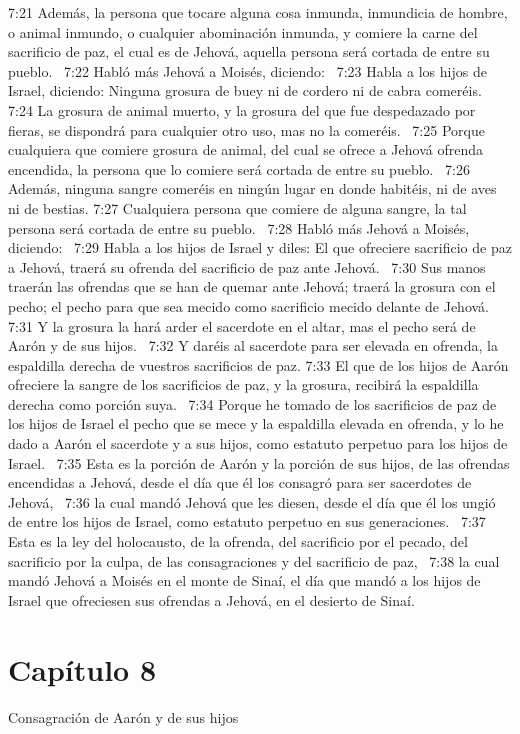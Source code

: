 7:21 Además, la persona que tocare alguna cosa inmunda, inmundicia de hombre, o animal inmundo, o cualquier abominación inmunda, y comiere la carne del sacrificio de paz, el cual es de Jehová, aquella persona será cortada de entre su pueblo.  
7:22 Habló más Jehová a Moisés, diciendo:  
7:23 Habla a los hijos de Israel, diciendo: Ninguna grosura de buey ni de cordero ni de cabra comeréis.  
7:24 La grosura de animal muerto, y la grosura del que fue despedazado por fieras, se dispondrá para cualquier otro uso, mas no la comeréis.  
7:25 Porque cualquiera que comiere grosura de animal, del cual se ofrece a Jehová ofrenda encendida, la persona que lo comiere será cortada de entre su pueblo.  
7:26 Además, ninguna sangre comeréis en ningún lugar en donde habitéis, ni de aves ni de bestias. 
7:27 Cualquiera persona que comiere de alguna sangre, la tal persona será cortada de entre su pueblo.  
7:28 Habló más Jehová a Moisés, diciendo:  
7:29 Habla a los hijos de Israel y diles: El que ofreciere sacrificio de paz a Jehová, traerá su ofrenda del sacrificio de paz ante Jehová.  
7:30 Sus manos traerán las ofrendas que se han de quemar ante Jehová; traerá la grosura con el pecho; el pecho para que sea mecido como sacrificio mecido delante de Jehová.  
7:31 Y la grosura la hará arder el sacerdote en el altar, mas el pecho será de Aarón y de sus hijos.  
7:32 Y daréis al sacerdote para ser elevada en ofrenda, la espaldilla derecha de vuestros sacrificios de paz. 
7:33 El que de los hijos de Aarón ofreciere la sangre de los sacrificios de paz, y la grosura, recibirá la espaldilla derecha como porción suya.  
7:34 Porque he tomado de los sacrificios de paz de los hijos de Israel el pecho que se mece y la espaldilla elevada en ofrenda, y lo he dado a Aarón el sacerdote y a sus hijos, como estatuto perpetuo para los hijos de Israel.  
7:35 Esta es la porción de Aarón y la porción de sus hijos, de las ofrendas encendidas a Jehová, desde el día que él los consagró para ser sacerdotes de Jehová,  
7:36 la cual mandó Jehová que les diesen, desde el día que él los ungió de entre los hijos de Israel, como estatuto perpetuo en sus generaciones.  
7:37 Esta es la ley del holocausto, de la ofrenda, del sacrificio por el pecado, del sacrificio por la culpa, de las consagraciones y del sacrificio de paz,  
7:38 la cual mandó Jehová a Moisés en el monte de Sinaí, el día que mandó a los hijos de Israel que ofreciesen sus ofrendas a Jehová, en el desierto de Sinaí. 
\section*{Capítulo 8 }
Consagración de Aarón y de sus hijos   

